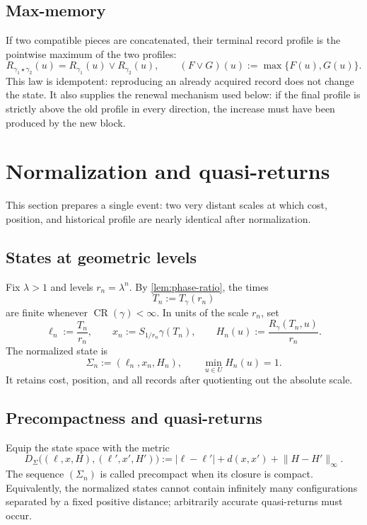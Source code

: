 \documentclass[10pt,a4paper]{article}
\theoremstyle{definition}
\theoremstyle{remark}
\DeclareMathOperator{\CR}{CR}
\newcommand{\norm}[1]{\lVert #1\rVert}
\newcommand{\abs}[1]{\lvert #1\rvert}
\newcommand{\vmax}{\mathbin{\vee}}
\begin{document}
\subsection{Max-memory}
If two compatible pieces are concatenated, their terminal record profile is the pointwise maximum of the two profiles:
\begin{equation}
R_{\gamma_1\star\gamma_2}(u)
=R_{\gamma_1}(u)\vmax R_{\gamma_2}(u),
\qquad
(F\vmax G)(u):=\max\{F(u),G(u)\}.
\label{eq:max-memory}
\end{equation}
This law is idempotent: reproducing an already acquired record does not change the state. It also supplies the renewal mechanism used below: if the final profile is strictly above the old profile in every direction, the increase must have been produced by the new block.

\section{Normalization and quasi-returns}
This section prepares a single event: two very distant scales at which cost, position, and historical profile are nearly identical after normalization.

\subsection{States at geometric levels}
Fix $\lambda>1$ and levels $r_n=\lambda^n$. By \cref{lem:phase-ratio}, the times
\[
T_n:=T_\gamma(r_n)
\]
are finite whenever $\CR(\gamma)<\infty$. In units of the scale $r_n$, set
\begin{equation}
\ell_n:=\frac{T_n}{r_n},
\qquad
x_n:=S_{1/r_n}\gamma(T_n),
\qquad
H_n(u):=\frac{R_\gamma(T_n,u)}{r_n}.
\label{eq:normalized-state-components}
\end{equation}
The normalized state is
\begin{equation}
\Sigma_n:=(\ell_n,x_n,H_n),
\qquad
\min_{u\in U}H_n(u)=1.
\label{eq:normalized-state}
\end{equation}
It retains cost, position, and all records after quotienting out the absolute scale.

\subsection{Precompactness and quasi-returns}
Equip the state space with the metric
\begin{equation}
D_\Sigma\bigl((\ell,x,H),(\ell',x',H')\bigr)
:=\abs{\ell-\ell'}+d(x,x')+\norm{H-H'}_\infty.
\label{eq:state-metric}
\end{equation}
The sequence $(\Sigma_n)$ is called precompact when its closure is compact. Equivalently, the normalized states cannot contain infinitely many configurations separated by a fixed positive distance; arbitrarily accurate quasi-returns must occur.
\end{document}
